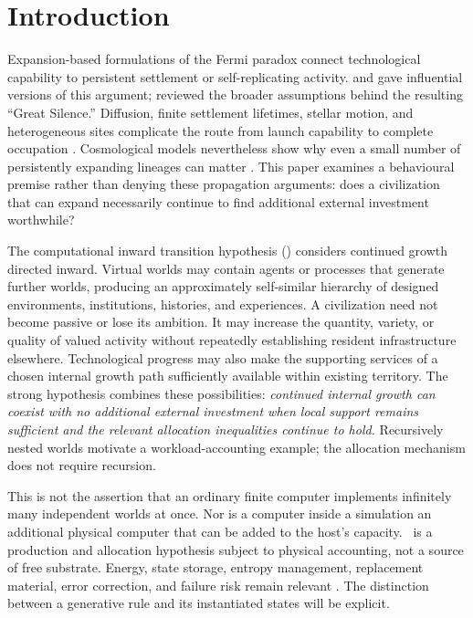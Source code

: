 \section{Introduction}

Expansion-based formulations of the Fermi paradox connect technological capability to persistent settlement or self-replicating activity. \citet{Hart1975} and \citet{Tipler1980} gave influential versions of this argument; \citet{Brin1983} reviewed the broader assumptions behind the resulting ``Great Silence.'' Diffusion, finite settlement lifetimes, stellar motion, and heterogeneous sites complicate the route from launch capability to complete occupation \citep{NewmanSagan1981,CarrollNellenback2019}. Cosmological models nevertheless show why even a small number of persistently expanding lineages can matter \citep{Olson2015,Hanson2021,Kipping2026}. This paper examines a behavioural premise rather than denying these propagation arguments: does a civilization that can expand necessarily continue to find additional external investment worthwhile?

The computational inward transition hypothesis (\CITH) considers continued growth directed inward. Virtual worlds may contain agents or processes that generate further worlds, producing an approximately self-similar hierarchy of designed environments, institutions, histories, and experiences. A civilization need not become passive or lose its ambition. It may increase the quantity, variety, or quality of valued activity without repeatedly establishing resident infrastructure elsewhere. Technological progress may also make the supporting services of a chosen internal growth path sufficiently available within existing territory. The strong hypothesis combines these possibilities: \emph{continued internal growth can coexist with no additional external investment when local support remains sufficient and the relevant allocation inequalities continue to hold.} Recursively nested worlds motivate a workload-accounting example; the allocation mechanism does not require recursion.

This is not the assertion that an ordinary finite computer implements infinitely many independent worlds at once. Nor is a computer inside a simulation an additional physical computer that can be added to the host's capacity. \CITH\ is a production and allocation hypothesis subject to physical accounting, not a source of free substrate. Energy, state storage, entropy management, replacement material, error correction, and failure risk remain relevant \citep{Landauer1961,Bennett1973,Lloyd2000}. The distinction between a generative rule and its instantiated states will be explicit.

